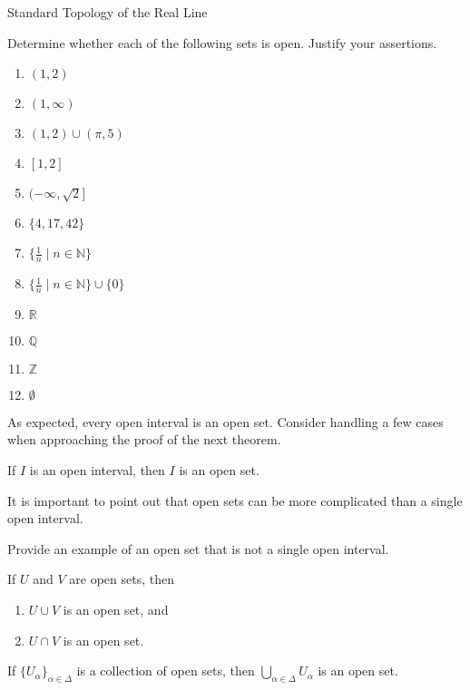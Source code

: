 \begin{section}{Standard Topology of the Real Line}
\begin{problem}\label{prob:open or not}
Determine whether each of the following sets is open. Justify your assertions.
\begin{multicols}{2}
\begin{enumerate}[label=\textrm{(\alph*)}]
\item $(1,2)$
\item $(1,\infty)$
\item $(1,2)\cup (\pi,5)$
\item $[1,2]$
\item $(-\infty,\sqrt{2}]$
\item $\{4,17,42\}$
\item $\{\frac{1}{n}\mid n\in \mathbb{N}\}$
\item $\{\frac{1}{n}\mid n\in \mathbb{N}\}\cup \{0\}$
\item $\mathbb{R}$
\item $\mathbb{Q}$
\item $\mathbb{Z}$
\item $\emptyset$
\end{enumerate}
\end{multicols}
\end{problem}

As expected, every open interval is an open set. Consider handling a few cases when approaching the proof of the next theorem.

\begin{theorem}
If $I$ is an open interval, then $I$ is an open set. 
\end{theorem}

It is important to point out that open sets can be more complicated than a single open interval.

\begin{problem}
Provide an example of an open set that is not a single open interval.
\end{problem}

\begin{theorem}\label{thm:finite union and intersection of open sets}
If $U$ and $V$ are open sets, then 
\begin{enumerate}[label=\textrm{(\alph*)}]
\item $U\cup V$ is an open set, and
\item $U\cap V$ is an open set.
\end{enumerate}
\end{theorem}

\begin{theorem}\label{thm:union of open sets}
If $\{U_{\alpha}\}_{\alpha\in\Delta}$ is a collection of open sets, then $\bigcup_{\alpha\in\Delta} U_{\alpha}$ is an open set.
\end{theorem}


\end{section}
